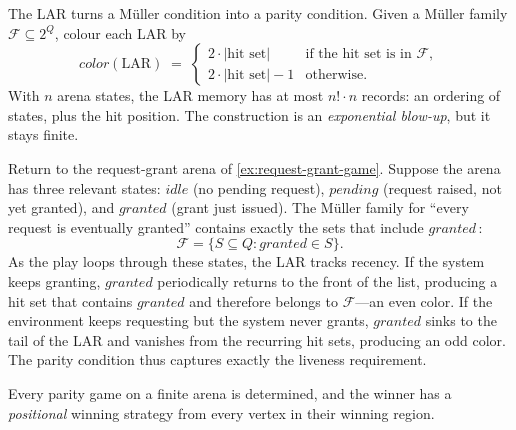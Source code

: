 The LAR turns a M\"uller condition into a parity condition.  Given a
M\"uller family $\mathcal{F}\subseteq 2^Q$, colour each LAR by
\[
  \textit{color}(\text{LAR}) \;=\;
  \begin{cases}
    2\cdot|\text{hit set}|   & \text{if the hit set is in } \mathcal{F},\\
    2\cdot|\text{hit set}|-1 & \text{otherwise.}
  \end{cases}
\]
With $n$ arena states, the LAR memory has at most $n!\cdot n$ records:
an ordering of states, plus the hit position.  The construction is an
\emph{exponential blow-up}, but it stays finite.

\begin{example}
\label{ex:request-grant-muller}
Return to the request-grant arena of \cref{ex:request-grant-game}.
Suppose the arena has three relevant states:
$\mathit{idle}$ (no pending request),
$\mathit{pending}$ (request raised, not yet granted), and
$\mathit{granted}$ (grant just issued).
The M\"uller family for ``every request is eventually granted'' contains
exactly the sets that include $\mathit{granted}$\,:
\[
  \mathcal{F}=\bigl\{S\subseteq Q : \mathit{granted}\in S\bigr\}.
\]
As the play loops through these states, the LAR tracks recency.  If the
system keeps granting, $\mathit{granted}$ periodically returns to the
front of the list, producing a hit set that contains $\mathit{granted}$
and therefore belongs to $\mathcal{F}$---an even color.  If the
environment keeps requesting but the system never grants,
$\mathit{granted}$ sinks to the tail of the LAR and vanishes from the
recurring hit sets, producing an odd color.  The parity condition thus
captures exactly the liveness requirement.
\end{example}

\begin{theorem}
\label{thm:buchi-landweber}
Every parity game on a finite arena is determined, and the winner has a
\emph{positional} winning strategy from every vertex in their winning
region.
\end{theorem}

